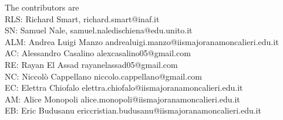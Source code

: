 \clearpage
The contributors are\\
RLS: Richard Smart, richard.smart@inaf.it\\
SN: Samuel Nale, samuel.naledischiena@edu.unito.it\\
ALM: Andrea Luigi Manzo andrealuigi.manzo@iismajoranamoncalieri.edu.it\\
AC: Alessandro Casalino alexcasalino05@gmail.com\\
RE: Rayan El Assad rayanelassad05@gmail.com\\ 
NC: Niccolò Cappellano niccolo.cappellano@gmail.com\\
EC: Elettra Chiofalo elettra.chiofalo@iismajoranamoncalieri.edu.it\\
AM: Alice Monopoli alice.monopoli@iismajoranamoncalieri.edu.it\\
EB: Eric Budusanu ericcristian.budusanu@iismajoranamoncalieri.edu.it\\